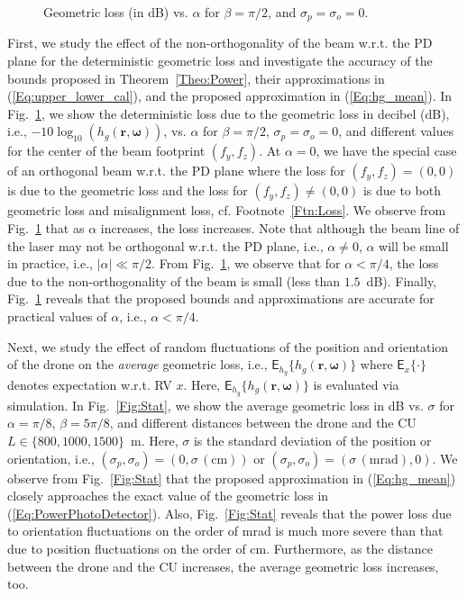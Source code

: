 \documentclass[conference]{IEEEtran}
\begin{document}
\begin{figure}
  \centering
\vspace{-8mm}
\caption{Geometric loss (in dB) vs. $\alpha$ for $\beta=\pi/2$, and $\sigma_p=\sigma_o=0$.  } \vspace{-2mm}
\label{Fig:Bound}
\end{figure}

First, we study the effect of the non-orthogonality of the beam w.r.t. the PD plane for the deterministic geometric loss and investigate the accuracy of the bounds proposed in Theorem~\ref{Theo:Power}, their approximations in (\ref{Eq:upper_lower_cal}), and the proposed approximation in (\ref{Eq:hg_mean}).  In Fig.~\ref{Fig:Bound}, we show the deterministic loss due to the geometric loss in decibel (dB), i.e., $-10\log_{10}(h_g(\mathbf{r},\boldsymbol{\omega}))$, vs. $\alpha$ for $\beta=\pi/2$, $\sigma_p=\sigma_o=0$, and different values for the center of the beam footprint $(f_y,f_z)$.  At $\alpha=0$, we have the special case of an orthogonal beam w.r.t. the PD plane where the loss for $(f_y,f_z)= (0,0)$ is due to the geometric loss and the loss for $(f_y,f_z)\neq (0,0)$ is due to both geometric loss and misalignment loss, cf. Footnote~\ref{Ftn:Loss}. We observe from Fig.~\ref{Fig:Bound} that as $\alpha$ increases, the loss increases. Note that although the beam line of the laser may not be orthogonal w.r.t. the PD plane, i.e., $\alpha\neq0$, $\alpha$ will be small in practice, i.e., $|\alpha|\ll \pi/2$. From Fig.~\ref{Fig:Bound}, we observe that for $\alpha < \pi/4$, the loss due to the non-orthogonality of the  beam is small (less than $1.5$~dB). Finally, Fig.~\ref{Fig:Bound} reveals that the proposed bounds and  approximations are accurate for practical values of $\alpha$, i.e., $\alpha<\pi/4$. 


Next, we study the effect of random fluctuations of the position and orientation of the drone on the \textit{average} geometric loss, i.e., $\mathsf{E}_{h_g}\{h_g(\mathbf{r},\boldsymbol{\omega})\}$ where $\mathsf{E}_{x}\{\cdot\}$ denotes expectation w.r.t. RV $x$. Here, $\mathsf{E}_{h_g}\{h_g(\mathbf{r},\boldsymbol{\omega})\}$ is evaluated via simulation. In Fig.~\ref{Fig:Stat}, we show the average  geometric loss in dB vs. $\sigma$ for $\alpha=\pi/8$, $\beta=5\pi/8$, and different distances between the drone and the CU $L\in\{800,1000,1500\}$~m. Here, $\sigma$ is the standard deviation of the position or orientation, i.e., $(\sigma_p,\sigma_o)=(0,\sigma\,(\mathrm{cm}))$ or  $(\sigma_p,\sigma_o)=(\sigma\,(\mathrm{mrad}),0)$. 
We observe from Fig.~\ref{Fig:Stat} that the proposed approximation in (\ref{Eq:hg_mean}) closely approaches the exact value of the geometric loss in (\ref{Eq:PowerPhotoDetector}). Also, Fig.~\ref{Fig:Stat} reveals that the power loss due to orientation fluctuations on the order of mrad is much more severe than that due to position fluctuations on the order of cm. Furthermore, as the distance between the drone and the CU increases, the average geometric loss increases, too.
\end{document}
